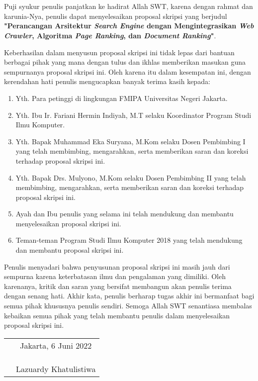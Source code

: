 \chapter*{}

Puji syukur penulis panjatkan ke hadirat Allah SWT, karena dengan rahmat dan karunia-Nya, penulis dapat menyelesaikan proposal skripsi yang berjudul \textbf{"Perancangan Arsitektur \textit{Search Engine} dengan Mengintegrasikan \textit{Web Crawler}, Algoritma \textit{Page Ranking}, dan \textit{Document Ranking}"}.

Keberhasilan dalam menyusun proposal skripsi ini tidak lepas dari bantuan berbagai pihak yang mana dengan tulus dan ikhlas memberikan masukan guna sempurnanya proposal skripsi ini. Oleh karena itu dalam kesempatan ini, dengan kerendahan hati penulis mengucapkan banyak terima kasih kepada:

\begin{enumerate}

	\item{Yth. Para petinggi di lingkungan FMIPA Universitas Negeri Jakarta.}
	\item{Yth. Ibu Ir. Fariani Hermin Indiyah, M.T selaku Koordinator Program Studi Ilmu Komputer.}
	\item{Yth. Bapak Muhammad Eka Suryana, M.Kom selaku Dosen Pembimbing I yang telah membimbing, mengarahkan, serta memberikan saran dan koreksi terhadap proposal skripsi ini.}
	\item{Yth. Bapak Drs. Mulyono, M.Kom selaku Dosen Pembimbing II yang telah membimbing, mengarahkan, serta memberikan saran dan koreksi terhadap proposal skripsi ini.}
	\item{Ayah dan Ibu penulis yang selama ini telah mendukung dan membantu menyelesaikan proposal skripsi ini.}
	\item{Teman-teman Program Studi Ilmu Komputer 2018 yang telah mendukung dan membantu proposal skripsi ini.}
	
\end{enumerate}

Penulis menyadari bahwa penyusunan proposal skripsi ini masih jauh dari sempurna karena keterbatasan ilmu dan pengalaman yang dimiliki. Oleh karenanya, kritik dan saran yang bersifat membangun akan penulis terima dengan senang hati. Akhir kata, penulis berharap tugas akhir ini bermanfaat bagi semua pihak khususnya penulis sendiri. Semoga Allah SWT senantiasa membalas kebaikan semua pihak yang telah membantu penulis dalam menyelesaikan proposal skripsi ini.

\vspace{4cm}

\begin{tabular}{p{7.5cm}c}
	&Jakarta, 6 Juni 2022\\
	&\\
	&\\
	&\\
	&Lazuardy Khatulistiwa
\end{tabular}